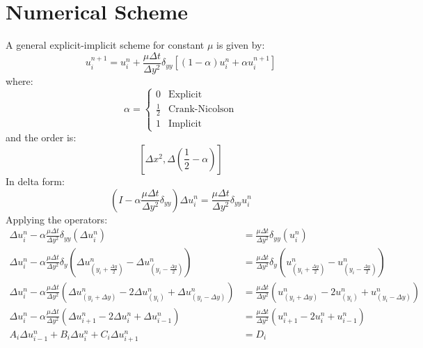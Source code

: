 \documentclass[11pt, a4paper]{article}
\begin{document}
\section{Numerical Scheme}
A general explicit-implicit scheme for constant $\mu$ is given by:
\begin{equation}
    u^{n+1}_i = u^n_i + \frac{\mu\Delta t}{\Delta y^2}\delta_{yy}\left[\left(1-\alpha\right)u^n_i+\alpha u^{n+1}_i\right]
\end{equation}
where:
\begin{equation}
    \alpha = \left\{\begin{matrix}
        0 & \text{Explicit}\\
        \frac{1}{2} & \text{Crank-Nicolson}\\
        1 & \text{Implicit}
    \end{matrix}\right.
\end{equation}
and the order is:
\begin{equation}
    \left[\Delta x^2, \Delta\left(\frac{1}{2}-\alpha\right)\right]
\end{equation}
In delta form:
\begin{equation}
    \left(I-\alpha\frac{\mu\Delta t}{\Delta y^2}\delta_{yy}\right)\Delta u^n_i = \frac{\mu\Delta t}{\Delta y^2}\delta_{yy}u^n_i
\end{equation}
Applying the operators:
\begin{align}
    \Delta u^n_i - \alpha\frac{\mu\Delta t}{\Delta y^2}\delta_{yy}\left(\Delta u^n_i\right) &= \frac{\mu\Delta t}{\Delta y^2}\delta_{yy}\left(u^n_i\right)\\
    \Delta u^n_i - \alpha\frac{\mu\Delta t}{\Delta y^2}\delta_{y}\left(\Delta u^n_{\left(y_i+\frac{\Delta y}{2}\right)} - \Delta u^n_{\left(y_i-\frac{\Delta y}{2}\right)}\right) &= \frac{\mu\Delta t}{\Delta y^2}\delta_{y}\left(u^n_{\left(y_i+\frac{\Delta y}{2}\right)} - u^n_{\left(y_i-\frac{\Delta y}{2}\right)}\right)\\
    \Delta u^n_i - \alpha\frac{\mu\Delta t}{\Delta y^2}\left(\scriptstyle\Delta u^n_{\left(y_i+\Delta y\right)} - 2\Delta u^n_{\left(y_i\right)} + \Delta u^n_{\left(y_i - \Delta y\right)}\right) &= \frac{\mu\Delta t}{\Delta y^2}\left(\scriptstyle u^n_{\left(y_i+\Delta y\right)} - 2u^n_{\left(y_i\right)} + u^n_{\left(y_i-\Delta y\right)}\right)\\
    \Delta u^n_i - \alpha\frac{\mu\Delta t}{\Delta y^2}\left(\Delta u^n_{i+1}-2\Delta u^n_i + \Delta u^n_{i-1}\right) &= \frac{\mu\Delta t}{\Delta y^2}\left(u^n_{i+1} - 2u^n_{i} + u^n_{i-1}\right)\\
    A_i\Delta u^n_{i-1}+B_i\Delta u^n_i+C_i\Delta u^n_{i+1} &= D_i
\end{align}
\end{document}
